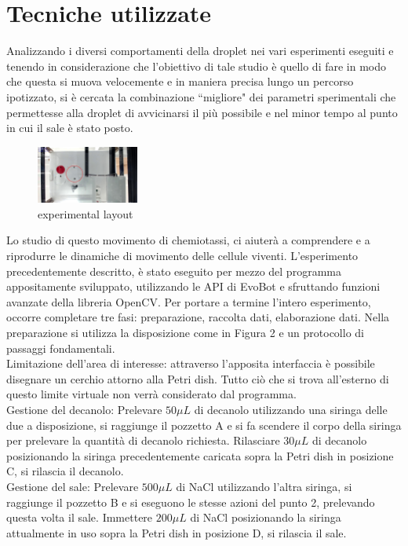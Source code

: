 \section{Tecniche utilizzate}
Analizzando i diversi comportamenti della droplet nei vari esperimenti eseguiti e tenendo in considerazione che l'obiettivo di tale studio è quello di fare in modo che questa si muova velocemente e in maniera precisa lungo un percorso ipotizzato, si è cercata la combinazione ``migliore" dei parametri sperimentali che permettesse alla droplet di avvicinarsi il più possibile e nel minor tempo al punto in cui il sale è stato posto. 
\begin{figure}
\begin{center}
	  \includegraphics[width=0.3\textwidth]{immagini/exp1.jpg}
\end{center}
	 \caption{experimental layout}
\end{figure} 
Lo studio di questo movimento di chemiotassi, ci aiuterà a comprendere e a riprodurre le dinamiche di movimento delle cellule viventi. 
L'esperimento precedentemente descritto, è stato eseguito per mezzo del programma appositamente sviluppato, utilizzando le API di EvoBot e sfruttando funzioni avanzate della libreria OpenCV. 
Per portare a termine l'intero esperimento, occorre completare tre fasi: preparazione, raccolta dati, elaborazione dati. 
Nella preparazione si utilizza la disposizione come in Figura 2 e un protocollo di passaggi fondamentali.
\\Limitazione dell'area di interesse: attraverso l'apposita interfaccia è possibile disegnare un cerchio attorno alla Petri dish. Tutto ciò che si trova all'esterno di questo limite virtuale non verrà considerato dal programma.
\\Gestione del decanolo: Prelevare $50\mu L$ di decanolo utilizzando una siringa delle due a disposizione, si raggiunge il pozzetto A e si fa scendere il corpo della siringa per prelevare la quantità di decanolo richiesta. Rilasciare $30\mu L$ di decanolo posizionando la siringa precedentemente caricata sopra la Petri dish in posizione C, si rilascia il decanolo. 
\\Gestione del sale: Prelevare $500\mu L$ di NaCl utilizzando l'altra siringa, si raggiunge il pozzetto B e si eseguono le stesse azioni del punto 2, prelevando questa volta il sale. Immettere $200\mu L$ di NaCl posizionando la siringa attualmente in uso sopra la Petri dish in posizione D, si rilascia il sale. 
